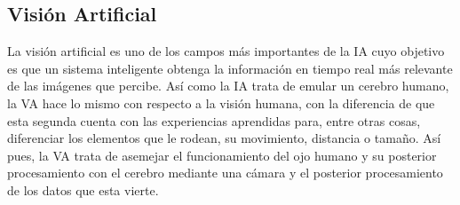 \subsection{Visión Artificial}
\label{sec:subseccion}
La visión artificial es uno de los campos más importantes de la IA cuyo objetivo es que un sistema inteligente obtenga la información en tiempo real más relevante de las imágenes que percibe. Así como la IA trata de emular un cerebro humano, la VA hace lo mismo con respecto a la visión humana, con la diferencia de que esta segunda cuenta con las experiencias aprendidas para, entre otras cosas, diferenciar los elementos que le rodean, su movimiento, distancia o tamaño. Así pues, la VA trata de asemejar el funcionamiento del ojo humano y su posterior procesamiento con el cerebro mediante  una cámara y el posterior procesamiento de los datos que esta vierte.\\

